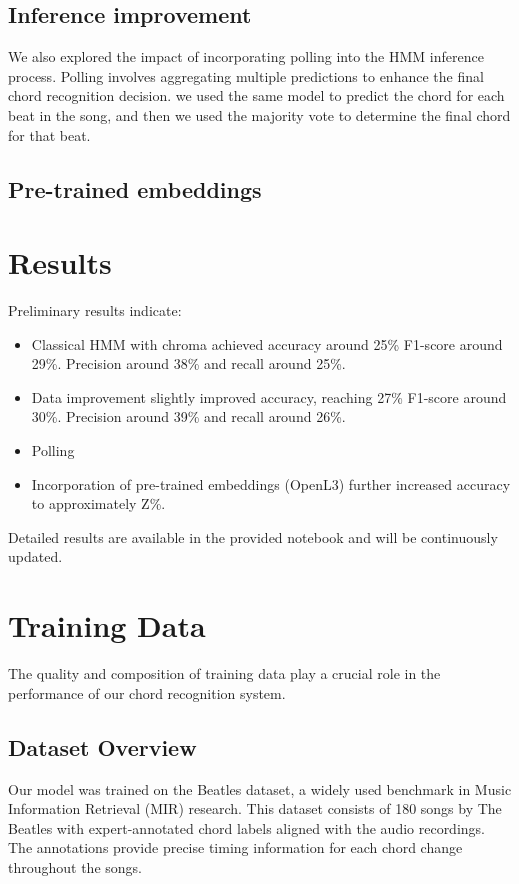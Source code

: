 \documentclass{article}
\begin{document}
\subsection{Inference improvement}
We also explored the impact of incorporating polling into the HMM inference process.
Polling involves aggregating multiple predictions to enhance the final chord recognition decision.
we used the same model to predict the chord for each beat in the song, and then we used the majority vote to determine the final chord for that beat.

\subsection{Pre-trained embeddings}


\section{Results}
Preliminary results indicate:
\begin{itemize}
    \item Classical HMM with chroma achieved accuracy around 25\% F1-score around 29\%. Precision around 38\% and recall around 25\%.
    \item Data improvement slightly improved accuracy, reaching 27\% F1-score around 30\%. Precision around 39\% and recall around 26\%.
    \item Polling
    \item Incorporation of pre-trained embeddings (OpenL3) further increased accuracy to approximately Z\%.
\end{itemize}
Detailed results are available in the provided notebook and will be continuously updated.

\section{Training Data}
\label{sec:training_data}

The quality and composition of training data play a crucial role in the performance of our chord recognition system.

\subsection{Dataset Overview}
Our model was trained on the Beatles dataset, a widely used benchmark in Music Information Retrieval (MIR) research. This dataset consists of 180 songs by The Beatles with expert-annotated chord labels aligned with the audio recordings. The annotations provide precise timing information for each chord change throughout the songs.
\end{document}
